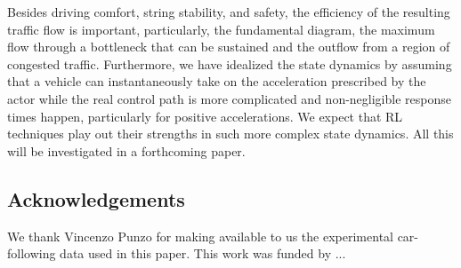 \documentclass[review]{elsarticle}
\providecommand{\martin}[1]{#1}                  %
\providecommand{\martinc}[1]{}                  %
\providecommand{\3}{{\ss}}
\begin{document}
	Besides driving comfort, string stability, and safety,
	the efficiency of the resulting traffic flow is important,
	particularly, the fundamental diagram, the maximum flow through a
	bottleneck that can be 
	sustained and the outflow from a region of congested
	traffic. Furthermore, we have idealized the state dynamics by
	assuming that a vehicle can instantaneously take on the acceleration
	prescribed by the actor while the real control path is more
	complicated and non-negligible response times happen, particularly
	for positive accelerations. We expect that RL techniques play out
	their strengths in such more complex state dynamics. All this  will
	be investigated in a forthcoming paper.
	
	\martin{
		\subsection*{Acknowledgements}
		We thank Vincenzo Punzo for making available to us the experimental
		car-following data used in this paper. This work was funded by ...}
	\martinc{Ostap: DFG oder andere funds nennen?}
	
	
	
	
	
	
	
\end{document}
